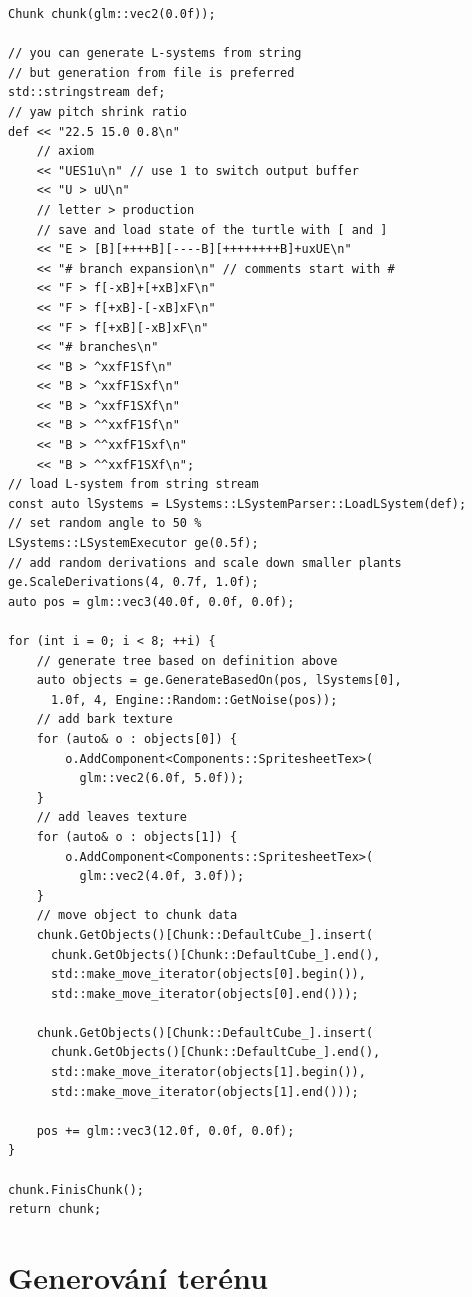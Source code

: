 \documentclass[thesis=M,czech]{FITthesis}[2019/12/23]
\begin{document}
\begin{verbatim}
Chunk chunk(glm::vec2(0.0f));

// you can generate L-systems from string
// but generation from file is preferred
std::stringstream def;
// yaw pitch shrink ratio
def << "22.5 15.0 0.8\n"
    // axiom
    << "UES1u\n" // use 1 to switch output buffer
    << "U > uU\n"
    // letter > production
    // save and load state of the turtle with [ and ]
    << "E > [B][++++B][----B][++++++++B]+uxUE\n"
    << "# branch expansion\n" // comments start with #
    << "F > f[-xB]+[+xB]xF\n"
    << "F > f[+xB]-[-xB]xF\n"
    << "F > f[+xB][-xB]xF\n"
    << "# branches\n"
    << "B > ^xxfF1Sf\n"
    << "B > ^xxfF1Sxf\n"
    << "B > ^xxfF1SXf\n"
    << "B > ^^xxfF1Sf\n"
    << "B > ^^xxfF1Sxf\n"
    << "B > ^^xxfF1SXf\n";
// load L-system from string stream
const auto lSystems = LSystems::LSystemParser::LoadLSystem(def);
// set random angle to 50 %
LSystems::LSystemExecutor ge(0.5f);
// add random derivations and scale down smaller plants
ge.ScaleDerivations(4, 0.7f, 1.0f);
auto pos = glm::vec3(40.0f, 0.0f, 0.0f);

for (int i = 0; i < 8; ++i) {
    // generate tree based on definition above
    auto objects = ge.GenerateBasedOn(pos, lSystems[0], 
      1.0f, 4, Engine::Random::GetNoise(pos));
    // add bark texture
    for (auto& o : objects[0]) {
        o.AddComponent<Components::SpritesheetTex>(
          glm::vec2(6.0f, 5.0f));
    }
    // add leaves texture
    for (auto& o : objects[1]) {
        o.AddComponent<Components::SpritesheetTex>(
          glm::vec2(4.0f, 3.0f));
    }
    // move object to chunk data
    chunk.GetObjects()[Chunk::DefaultCube_].insert(
      chunk.GetObjects()[Chunk::DefaultCube_].end(),
      std::make_move_iterator(objects[0].begin()),
      std::make_move_iterator(objects[0].end()));

    chunk.GetObjects()[Chunk::DefaultCube_].insert(
      chunk.GetObjects()[Chunk::DefaultCube_].end(),
      std::make_move_iterator(objects[1].begin()),
      std::make_move_iterator(objects[1].end()));

    pos += glm::vec3(12.0f, 0.0f, 0.0f);
}

chunk.FinisChunk();
return chunk;
\end{verbatim}

\section{Generování terénu}
\end{document}
